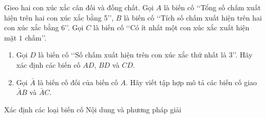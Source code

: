 \begin{bt}%
	Gieo hai con xúc xắc cân đối và đồng chất. Gọi $A$ là biến cố \lq\lq Tổng số chấm xuất hiện trên hai con xúc xắc bằng 5\rq\rq, $B$ là biến cố \lq\lq Tích số chấm xuất hiện trên hai con xúc xắc bằng 6\rq\rq. Gọi $C$ là biến cố \lq\lq Có ít nhất một con xúc xắc xuất hiện mặt $1$ chấm\rq\rq.
	\begin{enumerate}
		\item  Gọi $D$ là biến cố \lq\lq Số chấm xuất hiện trên con xúc xắc thứ nhất là 3\rq\rq. Hãy xác định các biến cố $AD$, $BD$ và $CD$.
		\item Gọi $\bar{A}$ là biến cố đối của biến cố $A$. Hãy viết tập hợp mô tả các biến cố giao $\bar{A}B$ và $\bar{A}C$.
	\end{enumerate}
\end{bt}

\begin{dang}{Xác định các loại biến cố}%
	Nội dung và phương pháp giải
\end{dang}
